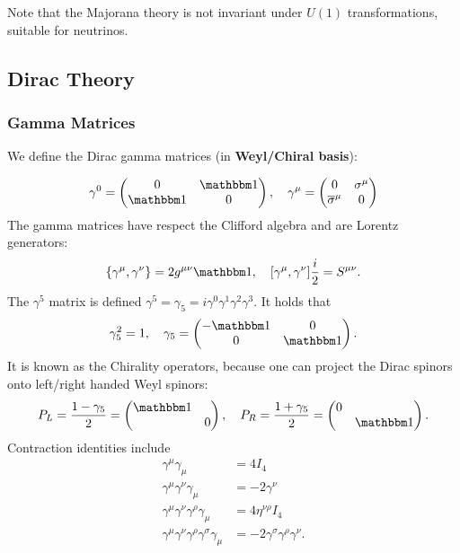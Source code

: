 \documentclass{article}
\begin{document}
Note that the Majorana theory is not invariant under $U(1)$ transformations, suitable for neutrinos.
\subsection{Dirac Theory}

\subsubsection{Gamma Matrices}

We define the Dirac gamma matrices (in \textbf{Weyl/Chiral basis}):

$$\gamma^0=\begin{pmatrix}0&\mathbbm 1\\\mathbbm 1&0\end{pmatrix},\quad\gamma^\mu=\begin{pmatrix}0&\sigma^\mu\\\overline\sigma^\mu&0\end{pmatrix}$$
The gamma matrices have respect the Clifford algebra and are Lorentz generators:
$$\acomm{\gamma^\mu}{\gamma^\nu}=2g^{\mu\nu}\mathbbm 1,\quad\comm{\gamma^\mu}{\gamma^\nu}\frac i2=S^{\mu\nu}.$$
The $\gamma^5$ matrix is defined $\gamma^5=\gamma_5=i\gamma^0\gamma^1\gamma^2\gamma^3$. It holds that 
\begin{equation}
    \gamma_5^2=1,\quad\gamma_5=\begin{pmatrix}-\mathbbm 1&0\\0&\mathbbm 1\end{pmatrix}.
\end{equation}
It is known as the Chirality operators, because one can project the Dirac spinors onto left/right handed Weyl spinors:
\begin{equation}
    P_L=\frac{1-\gamma_5}2=\begin{pmatrix}\mathbbm 1&\\&0\end{pmatrix},\quad P_R=\frac{1+\gamma_5}2=\begin{pmatrix}0&\\&\mathbbm 1\end{pmatrix}.
\end{equation}
Contraction identities include
\begin{align*}
    \gamma^\mu\gamma_\mu&=4I_4\\
    \gamma^\mu\gamma^\nu\gamma_\mu&=-2\gamma^\nu\\
    \gamma^\mu\gamma^\nu\gamma^\rho\gamma_\mu&=4\eta^{\nu\rho}I_4\\
    \gamma^\mu\gamma^\nu\gamma^\rho\gamma^\sigma\gamma_\mu&=-2\gamma^\sigma\gamma^\rho\gamma^\nu.
\end{align*}
\end{document}
